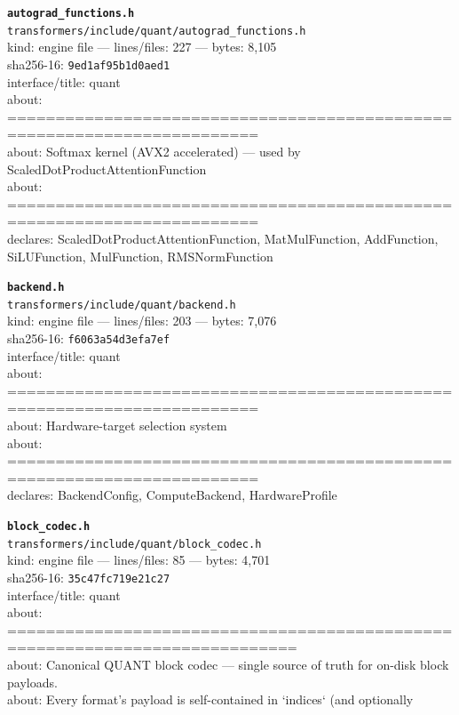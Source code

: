\noindent\textbf{\texttt{autograd\_functions.h}}\\
\texttt{transformers/include/quant/autograd\_functions.h}\\
kind: engine file --- lines/files: 227 --- bytes: 8,105\\
sha256-16: \texttt{9ed1af95b1d0aed1}\\
interface/title: quant\\
about: ========================================================================\\
about: Softmax kernel (AVX2 accelerated) — used by ScaledDotProductAttentionFunction\\
about: ========================================================================\\
declares: ScaledDotProductAttentionFunction, MatMulFunction, AddFunction, SiLUFunction, MulFunction, RMSNormFunction\\
\vspace*{6.0pt}

\noindent\textbf{\texttt{backend.h}}\\
\texttt{transformers/include/quant/backend.h}\\
kind: engine file --- lines/files: 203 --- bytes: 7,076\\
sha256-16: \texttt{f6063a54d3efa7ef}\\
interface/title: quant\\
about: ========================================================================\\
about: Hardware-target selection system\\
about: ========================================================================\\
declares: BackendConfig, ComputeBackend, HardwareProfile\\
\vspace*{6.0pt}

\noindent\textbf{\texttt{block\_codec.h}}\\
\texttt{transformers/include/quant/block\_codec.h}\\
kind: engine file --- lines/files: 85 --- bytes: 4,701\\
sha256-16: \texttt{35c47fc719e21c27}\\
interface/title: quant\\
about: ============================================================================\\
about: Canonical QUANT block codec — single source of truth for on-disk block payloads.\\
about: Every format's payload is self-contained in `indices` (and optionally\\
\vspace*{6.0pt}
\newpage

